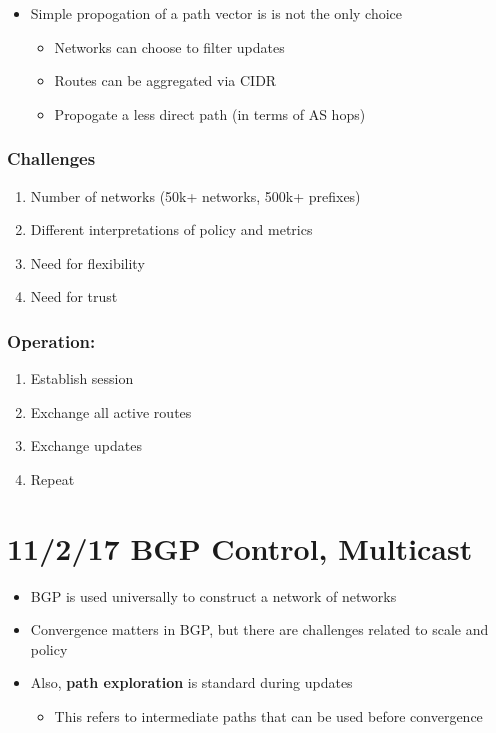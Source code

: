 \documentclass[11pt]{article}
\begin{document}
\begin{itemize}
\item Simple propogation of a path vector is is not the only choice
\begin{itemize}
\item Networks can choose to filter updates
\item Routes can be aggregated via CIDR
\item Propogate a less direct path (in terms of AS hops)
\end{itemize}
\end{itemize}


\subsubsection{Challenges}
\label{sec:orgheadline94}
\begin{enumerate}
\item Number of networks (50k+ networks, 500k+ prefixes)
\item Different interpretations of policy and metrics
\item Need for flexibility
\item Need for trust
\end{enumerate}

\subsubsection{Operation:}
\label{sec:orgheadline95}
\begin{enumerate}
\item Establish session
\item Exchange all active routes
\item Exchange updates
\item Repeat
\end{enumerate}

\section{11/2/17  BGP Control, Multicast}
\label{sec:orgheadline101}
\begin{itemize}
\item BGP is used universally to construct a network of networks
\item Convergence matters in BGP, but there are challenges related to
scale and policy
\item Also, \textbf{path exploration} is standard during updates
\begin{itemize}
\item This refers to intermediate paths that can be used before
convergence
\end{itemize}
\end{itemize}
\end{document}
